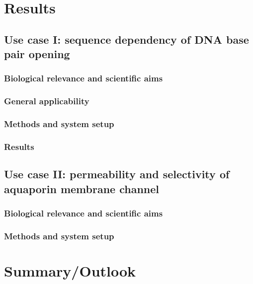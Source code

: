 \documentclass[11pt,a4paper]{article}
\begin{document}
\section{Results}
\subsection{Use case I: sequence dependency of DNA base pair opening}
\subsubsection{Biological relevance and scientific aims}

\subsubsection{General applicability}

\subsubsection{Methods and system setup}

\subsubsection{Results}

\subsection{Use case II: permeability and selectivity of aquaporin membrane channel}
\subsubsection{Biological relevance and scientific aims}
\cite{lindahl2018permeability}
\subsubsection{Methods and system setup}

\section{Summary/Outlook}


\end{document}

